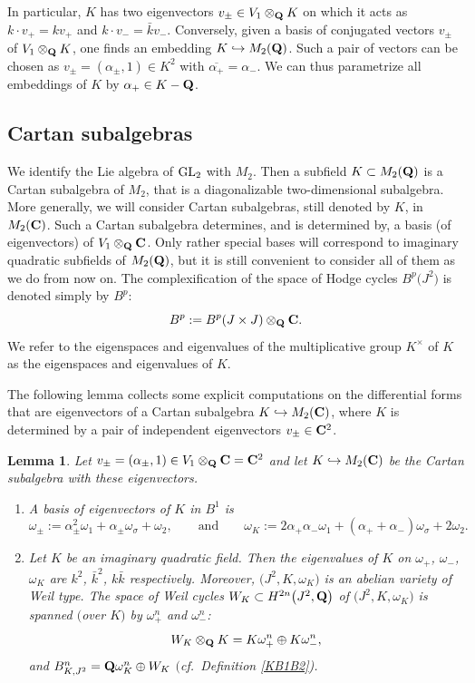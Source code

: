 \documentclass[pdftex]{sigma}
\numberwithin{equation}{section}
\newtheorem{Lemma}[Theorem]{Lemma}
\begin{document}
In particular, $K$ has two eigenvectors $v_\pm\in V_1\otimes_{\bf Q} K$ on which it acts
as $k\cdot v_+=kv_+$ and $k\cdot v_-=\bar{k} v_-$. Conversely, given a basis of conjugated
vectors $v_\pm$ of $V_1\otimes_{\bf Q} K$, one finds an embedding $K\hookrightarrow M_2({\bf Q})$.
Such a pair of vectors can be chosen as $v_\pm=(\alpha_\pm,1)\in K^2$ with
$\overline{\alpha_+}=\alpha_-$. We can thus parametrize all embeddings of $K$ by $\alpha_+\in K-{\bf Q}$.

\subsection{Cartan subalgebras}\label{csa}
We identify the Lie algebra of ${\rm GL}_2$ with $M_2$. Then a subfield $K\subset M_2({\bf Q})$ is a
Cartan subalgebra of $M_2$, that is a diagonalizable two-dimensional subalgebra.
More generally, we will consider Cartan subalgebras, still denoted by $K$, in $M_2({\bf C})$.
Such a Cartan subalgebra determines, and is determined by, a basis (of eigenvectors) of
$V_1\otimes_{\bf Q}{\bf C}$. Only rather special bases will correspond to imaginary quadratic subfields
of $M_2({\bf Q})$, but it is still convenient to consider all of them as we do from now on.
The complexification of the space of Hodge cycles
$B^p\big(J^2\big)$ is denoted simply by $B^p$:
\[
B^p := B^p(J\times J)\otimes_{\bf Q}{\bf C}.
\]
We refer to the eigenspaces and eigenvalues of the multiplicative group $K^\times$ of $K$
as the eigen\-spaces and eigenvalues of $K$.

The following lemma collects some explicit computations on the differential forms that are
eigenvectors of a Cartan subalgebra $K\hookrightarrow M_2({\bf C})$,
where $K$ is determined by a pair of independent eigenvectors $v_\pm \in {\bf C}^2$.

\begin{Lemma} \label{lemKB}
Let $v_\pm=(\alpha_\pm,1) \in V_1\otimes_{\bf Q}{\bf C}={\bf C}^2$
and let $K\hookrightarrow M_2({\bf C})$
be the Cartan subalgebra with these eigenvectors.
\begin{enumerate}\itemsep=0pt
\item[$1.$] A basis of eigenvectors of $K$ in $B^1$ is
\[
\omega_\pm := \alpha_\pm^2\omega_1 + \alpha_\pm\omega_\sigma + \omega_2,
\qquad\text{and}\qquad
\omega_K := 2\alpha_+\alpha_-\omega_1 + (\alpha_++\alpha_-)\omega_\sigma +
2\omega_2.
\]

\item[$2.$]
Let $K$ be an imaginary quadratic field. Then the eigenvalues of $K$ on $\omega_+$, $\omega_-$, $\omega_K$
are $k^2$, $\bar{k}^2$, $k\bar{k}$ respectively. Moreover, $\big(J^2,K,\omega_K\big)$
is an abelian variety of Weil type.
The space of Weil cycles $W_K\subset H^{2n}\big(J^2,{\bf Q}\big)$
of $\big(J^2,K,\omega_K\big)$ is spanned $($over $K)$ by $\omega_+^n$ and $\omega_-^n$:
\[
W_K\otimes_{\bf Q} K = K\omega_+^n \oplus K\omega_-^n,
\]
and $B^n_{K,J^2}={\bf Q} \omega_K^n\oplus W_K$ $($cf.\ Definition {\rm \ref{KB1B2})}.
\end{enumerate}
\end{Lemma}
\end{document}
